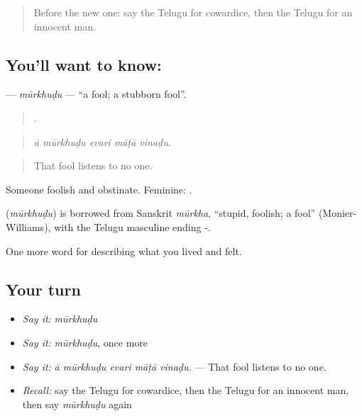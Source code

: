 \label{lesson:TE-C509-murkhudu}



\begin{quote}
Before the new one: say the Telugu for cowardice, then the Telugu for an innocent man.
\end{quote}

\subsection*{You'll want to know: }
\textbf{} — \emph{mūrkhuḍu} — \textquotedblleft{}a fool; a stubborn fool\textquotedblright{}.

\begin{quote}
    .
\end{quote}

\begin{quote}
\emph{ā mūrkhuḍu evari māṭā vinaḍu.}
\end{quote}

\begin{quote}
That fool listens to no one.
\end{quote}

Someone foolish and obstinate. Feminine: .

\begin{cousinweb}
\textbf{} (\emph{mūrkhuḍu}) is borrowed from Sanskrit \emph{mūrkha}, \textquotedblleft{}stupid, foolish; a fool\textquotedblright{} (Monier-Williams), with the Telugu masculine ending -.
\end{cousinweb}

\begin{grammarlens}[title={What you've built}]
One more word for describing what you lived and felt.
\end{grammarlens}

\subsection*{Your turn}
\begin{itemize}
\raggedright
  \item \emph{Say it:} \emph{mūrkhuḍu}
  \item \emph{Say it:} \emph{mūrkhuḍu}, once more
  \item \emph{Say it:} \emph{ā mūrkhuḍu evari māṭā vinaḍu.} — That fool listens to no one.
  \item \emph{Recall:} say the Telugu for cowardice, then the Telugu for an innocent man, then say \emph{mūrkhuḍu} again
\end{itemize}

